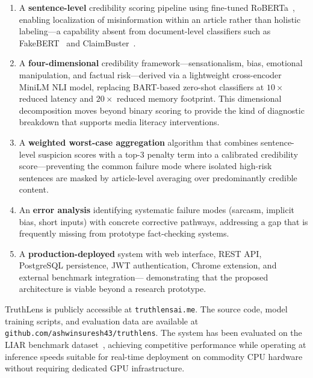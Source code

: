 \documentclass[journal]{IEEEtran}
\begin{document}
\begin{enumerate}
    \item A \textbf{sentence-level} credibility scoring pipeline using fine-tuned
    RoBERTa~\cite{liu2019roberta}, enabling localization of misinformation within an article
    rather than holistic labeling—a capability absent from document-level classifiers such
    as FakeBERT~\cite{kaliyar2021fakebert} and ClaimBuster~\cite{hassan2017claimbuster}.

    \item A \textbf{four-dimensional} credibility framework—sensationalism, bias, emotional
    manipulation, and factual risk—derived via a lightweight cross-encoder MiniLM NLI model,
    replacing BART-based zero-shot classifiers at $10\times$ reduced latency and $20\times$
    reduced memory footprint. This dimensional decomposition moves beyond binary scoring to
    provide the kind of diagnostic breakdown that supports media literacy interventions.

    \item A \textbf{weighted worst-case aggregation} algorithm that combines sentence-level
    suspicion scores with a top-3 penalty term into a calibrated credibility score—preventing
    the common failure mode where isolated high-risk sentences are masked by article-level
    averaging over predominantly credible content.

    \item An \textbf{error analysis} identifying systematic failure modes (sarcasm, implicit
    bias, short inputs) with concrete corrective pathways, addressing a gap that is frequently
    missing from prototype fact-checking systems.

    \item A \textbf{production-deployed} system with web interface, REST API, PostgreSQL
    persistence, JWT authentication, Chrome extension, and external benchmark integration—
    demonstrating that the proposed architecture is viable beyond a research prototype.
\end{enumerate}

TruthLens is publicly accessible at \texttt{truthlensai.me}. The source code, model
training scripts, and evaluation data are available at
\texttt{github.com/ashwinsuresh43/truthlens}. The system has been evaluated on the LIAR
benchmark dataset~\cite{wang2017liar}, achieving competitive performance while operating at
inference speeds suitable for real-time deployment on commodity CPU hardware without
requiring dedicated GPU infrastructure.
\end{document}

